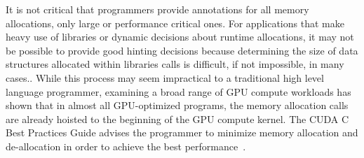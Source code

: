 It is not critical that programmers provide annotations for all memory
allocations, only large or performance critical ones. {\color{black}For applications that make
heavy use of libraries or dynamic decisions about runtime allocations, it may not be
possible to provide good hinting decisions because determining the size of data structures
allocated within libraries calls is difficult, if not impossible, in many cases.}.
While this process may seem impractical to a traditional high level language
programmer, examining a broad range of GPU compute workloads has shown that in
almost all GPU-optimized programs, the memory allocation calls are already
hoisted to the beginning of the GPU compute kernel. The CUDA C Best Practices
Guide advises the programmer to minimize memory allocation and
de-allocation in order to achieve the best performance~\cite{CUDAGuide}.
